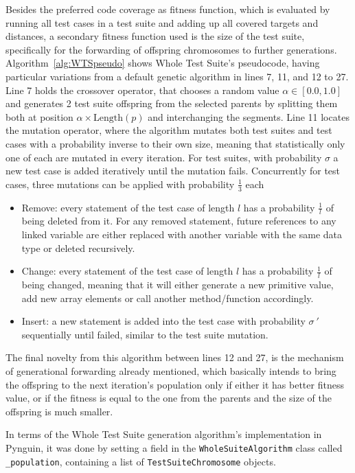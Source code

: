\documentclass[%
  chapterprefix=false,%
  open=right,%
  twoside=true,%
  paper=a4,%
  logofile={Figures/logo.png},%
  thesistype=master,%
  UKenglish,%
]{se2thesis}
\newcommand{\classname}[1]{\texttt{#1}}
\newcommand{\field}[1]{\texttt{#1}}
\begin{document}
Besides the preferred code coverage as fitness function, which is evaluated by running all test cases in a test suite and adding up all covered targets and distances, a secondary fitness function used is the size of the test suite, specifically for the forwarding of offspring chromosomes to further generations.
Algorithm~\ref{alg:WTSpseudo} shows Whole Test Suite's pseudocode, having particular variations from a default genetic algorithm in lines 7, 11, and 12 to 27.
Line 7 holds the crossover operator, that chooses a random value \(\alpha \in [0.0, 1.0]\) and generates 2 test suite offspring from the selected parents by splitting them both at position \(\alpha \times \text{Length}(p)\) and interchanging the segments.
Line 11 locates the mutation operator, where the algorithm mutates both test suites and test cases with a probability inverse to their own size, meaning that statistically only one of each are mutated in every iteration.
For test suites, with probability \(\sigma\) a new test case is added iteratively until the mutation fails.
Concurrently for test cases, three mutations can be applied with probability \(\frac{1}{3}\) each
\begin{itemize}
  \item Remove: every statement of the test case of length \(l\) has a probability \(\frac{1}{l}\) of being deleted from it. For any removed statement, future references to any linked variable are either replaced with another variable with the same data type or deleted recursively.
  \item Change: every statement of the test case of length \(l\) has a probability \(\frac{1}{l}\) of being changed, meaning that it will either generate a new primitive value, add new array elements or call another method/function accordingly.
  \item Insert: a new statement is added into the test case with probability \(\sigma~'\) sequentially until failed, similar to the test suite mutation.
\end{itemize}
The final novelty from this algorithm between lines 12 and 27, is the mechanism of generational forwarding already mentioned, which basically intends to bring the offspring to the next iteration's population only if either it has better fitness value, or if the fitness is equal to the one from the parents and the size of the offspring is much smaller.

In terms of the Whole Test Suite generation algorithm's implementation in Pynguin, it was done by setting a field in the \classname{WholeSuiteAlgorithm} class called \field{\_population}, containing a list of \classname{TestSuiteChromosome} objects.
\end{document}
